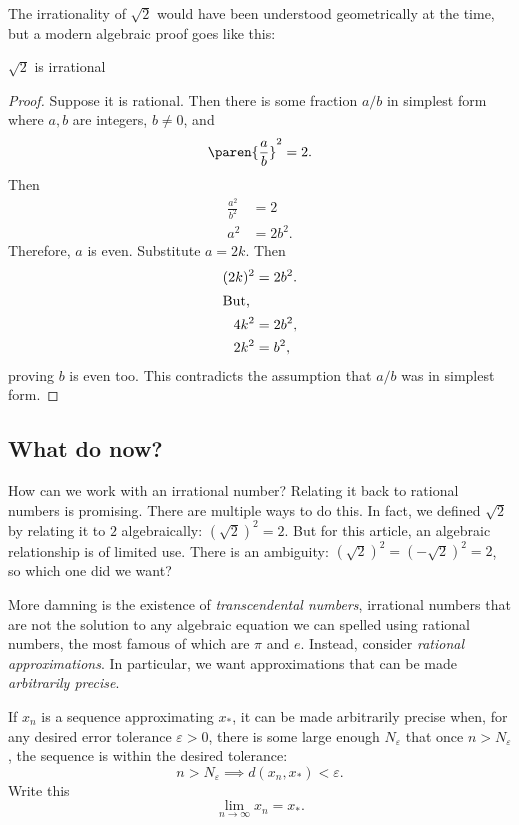 \documentclass{scrartcl}
\def\epsilon{\varepsilon}
\newcommand{\dist}{d}
\begin{document}
The irrationality of \(\sqrt 2\) would have been understood geometrically at the time, but a modern algebraic proof goes like this:
\begin{theorem}\(\sqrt 2\) is irrational
\end{theorem}
\begin{proof}
  Suppose it is rational. Then there is some fraction \(a/b\) in simplest form where \(a,b\) are integers, \(b\neq 0\), and
  \[
    \paren{\frac a b}^{2}=2.
  \]
  Then
  \begin{align*}
    \frac{a^{2}}{b^{2}} &= 2 \\
    a^{2}&= 2 b^{2}.
  \end{align*}
  Therefore, \(a\) is even. Substitute \(a=2k\). Then
  \begin{align}
    (2k)^{2} &=2 b^{2}. \\
                      \shortintertext{But,}
    4k^{2} &= 2b^{2}, \\
    2k^{2} &= b^{2},
  \end{align}
  proving \(b\) is even too. This contradicts the assumption that \(a/b\) was in simplest form.
\end{proof}

\subsection{What do now?}
How can we work with an irrational number? Relating it back to rational numbers is promising. There are multiple ways to do this. In fact, we defined \(\sqrt 2\) by relating it to \(2\) algebraically: \((\sqrt 2)^2 = 2\). But for this article, an algebraic relationship is of limited use. There is an ambiguity: \((\sqrt 2)^{2} = (-\sqrt 2)^{2} = 2\), so which one did we want?

More damning is the existence of \emph{transcendental numbers}, irrational numbers that are not the solution to any algebraic equation we can spelled using rational numbers, the most famous of which are \(\pi\) and \(e\). Instead, consider \emph{rational approximations}.
In particular, we want approximations that can be made \emph{arbitrarily precise}.
\begin{defn}
  If $x_{n}$ is a sequence approximating $x_{*}$, it can be made arbitrarily precise when, for any desired error tolerance $\epsilon > 0$, there is some large enough $N_{\epsilon}$ that once $n> N_{\epsilon}$, the sequence is within the desired tolerance:
  \[
    n>N_{\epsilon}\implies\dist(x_{n},x_{*}) < \epsilon.
  \]
  Write this
  \[
    \lim_{n\to\infty} x_{n} = x_{*}.
  \]
\end{defn}
\end{document}
